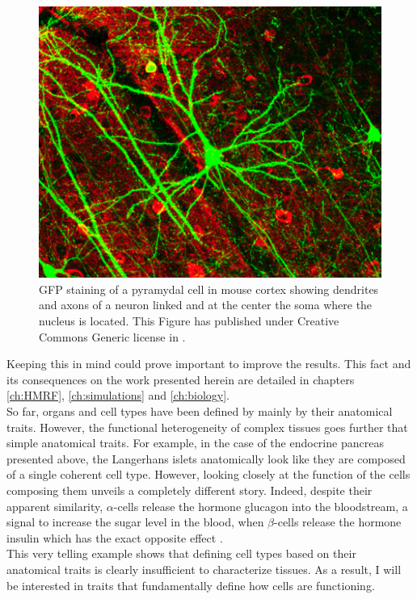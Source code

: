 \begin{figure}[bth]
\begin{center}
  \includegraphics[width=0.8\linewidth]{gfx/chapter1/neuron.png}
\end{center}
  \caption{GFP staining of a pyramydal cell in mouse cortex showing dendrites and axons of a neuron linked and at the center the soma where the nucleus is located. This Figure has published under Creative Commons Generic license in \cite{lee06}.}
  \label{fig:neuron}
\end{figure}
	
     Keeping this in mind could prove important to improve the results. This fact and its consequences on the work presented herein are detailed in chapters \ref{ch:HMRF}, \ref{ch:simulations} and \ref{ch:biology}.\\
     
     So far, organs and cell types have been defined by mainly by their anatomical traits. However, the functional heterogeneity of complex tissues goes further that simple anatomical traits. For example, in the case of the endocrine pancreas presented above, the Langerhans islets anatomically look like they are composed of a single coherent cell type. However, looking closely at the function of the cells composing them unveils a completely different story. Indeed, despite their apparent similarity, $\alpha$-cells release the hormone glucagon into the bloodstream, a signal to increase the sugar level in the blood, when $\beta$-cells release the hormone insulin which has the exact opposite effect \cite{costanzo06}.\\
     
     This very telling example shows that defining cell types based on their anatomical traits is clearly insufficient to characterize tissues.  As a result, I will be interested in traits that fundamentally define how cells are functioning.

